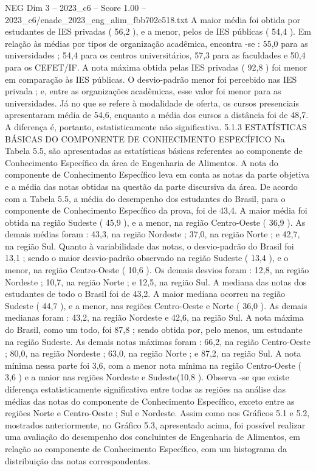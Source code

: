 \begin{textsample}{NEG Dim 3 – 2023\_c6 – Score 1.00 – 2023\_c6/enade\_2023\_eng\_alim\_fbb702e518.txt}
A maior média foi obtida por estudantes de IES privadas ( 56,2 ), e a menor, pelos de IES públicas ( 54,4 ).
Em relação às médias por tipos de organização acadêmica, encontra -se : 55,0 para as universidades ; 54,4 para os centros universitários, 57,3 para as faculdades e 50,4 para os CEFET/IF.
A nota máxima obtida pelas IES privadas ( 92,8 ) foi menor em comparação às IES públicas.
O desvio-padrão menor foi percebido nas IES privada ; e, entre as organizações acadêmicas, esse valor foi menor para as universidades.
Já no que se refere à modalidade de oferta, os cursos presenciais apresentaram média de 54,6, enquanto a média dos cursos a distância foi de 48,7.
A diferença é, portanto, estatisticamente não significativa. 5.1.3 ESTATÍSTICAS BÁSICAS DO COMPONENTE DE CONHECIMENTO ESPECÍFICO Na Tabela 5.5, são apresentadas as estatísticas básicas referentes ao componente de Conhecimento Específico da área de Engenharia de Alimentos.
A nota do componente de Conhecimento Específico leva em conta as notas da parte objetiva e a média das notas obtidas na questão da parte discursiva da área.
De acordo com a Tabela 5.5, a média do desempenho dos estudantes do Brasil, para o componente de Conhecimento Específico da prova, foi de 43,4.
A maior média foi obtida na região Sudeste ( 45,9 ), e a menor, na região Centro-Oeste ( 36,9 ).
As demais médias foram : 43,3, na região Nordeste ; 37,0, na região Norte ; e 42,7, na região Sul.
Quanto à variabilidade das notas, o desvio-padrão do Brasil foi 13,1 ; sendo o maior desvio-padrão observado na região Sudeste ( 13,4 ), e o menor, na região Centro-Oeste ( 10,6 ).
Os demais desvios foram : 12,8, na região Nordeste ; 10,7, na região Norte ; e 12,5, na região Sul.
A mediana das notas dos estudantes de todo o Brasil foi de 43,2.
A maior mediana ocorreu na região Sudeste ( 44,7 ), e a menor, nas regiões Centro-Oeste e Norte ( 36,0 ).
As demais medianas foram : 43,2, na região Nordeste e 42,6, na região Sul.
A nota máxima do Brasil, como um todo, foi 87,8 ; sendo obtida por, pelo menos, um estudante na região Sudeste.
As demais notas máximas foram : 66,2, na região Centro-Oeste ; 80,0, na região Nordeste ; 63,0, na região Norte ; e 87,2, na região Sul.
A nota mínima nessa parte foi 3,6, com a menor nota mínima na região Centro-Oeste ( 3,6 ) e a maior nas regiões Nordeste e Sudeste(10,8 ).
Observa -se que existe diferença estatisticamente significativa entre todas as regiões na análise das médias das notas do componente de Conhecimento Específico, exceto entre as regiões Norte e Centro-Oeste ; Sul e Nordeste.
Assim como nos Gráficos 5.1 e 5.2, mostrados anteriormente, no Gráfico 5.3, apresentado acima, foi possível realizar uma avaliação do desempenho dos concluintes de Engenharia de Alimentos, em relação ao componente de Conhecimento Específico, com um histograma da distribuição das notas correspondentes.

\end{textsample}
